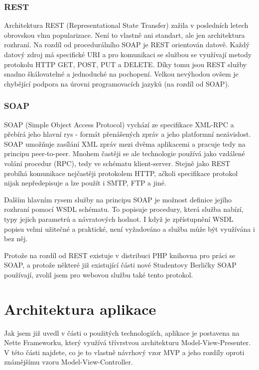 \documentclass[11pt,twoside,a4paper]{book}
\begin{document}
\subsubsection{REST}
Architektura REST (Representational State Transfer) zažila v posledních letech obrovskou vlnu popularizace. Není to vlastně ani standart, ale jen architektura rozhraní. Na rozdíl od procedurálního SOAP je REST orientován datově. Každý datový zdroj má specifické URI a pro komunikaci se službou se využívají metody protokolu HTTP GET, POST, PUT a DELETE. Díky tomu jsou REST služby snadno škálovatelné a jednoduché na pochopení. Velkou nevýhodou ovšem je chybějící podpora na úrovni programovacích jazyků (na rozdíl od SOAP).


\subsubsection{SOAP}
SOAP (Simple Object Access Protocol) vychází ze specifikace XML-RPC a přebírá jeho hlavní rys - formát přenášených zpráv a jeho platformní nezávislost. SOAP umožňuje zasílání XML zpráv mezi dvěma aplikacemi a pracuje tedy na principu peer-to-peer. Mnohem častěji se ale technologie používá jako vzdálené volání procedur (RPC), tedy ve schématu klient-server. Stejně jako REST probíhá komunikace nejčastěji protokolem HTTP, ačkoli specifikace protokol nijak nepředepisuje a lze použít i SMTP, FTP a jiné.

Dalším hlavním rysem služby na principu SOAP je možnost definice jejího rozhraní pomocí WSDL schématu. To popisuje procedury, která služba nabízí, typy jejich parametrů a návratových hodnot. I když je zpřístupnění WSDL popisu velmi užitečné a praktické, není vyžadováno a služba může být využívána i bez něj.

Protože na rozdíl od REST existuje v distribuci PHP knihovna pro práci se SOAP, a protože některé již existující části nové Studentovy Berličky SOAP používají, zvolil jsem pro webovou službu také tento protokol.

\section{Architektura aplikace}
Jak jsem již uvedl v části o použitých technologiích, aplikace je postavena na Nette Frameworku, který využívá třívrstvou architekturu Model-View-Presenter. V této části najdete, co je to vlastně návrhový vzor MVP a jeho rozdíly oproti známějšímu vzoru Model-View-Controller.
\end{document}
